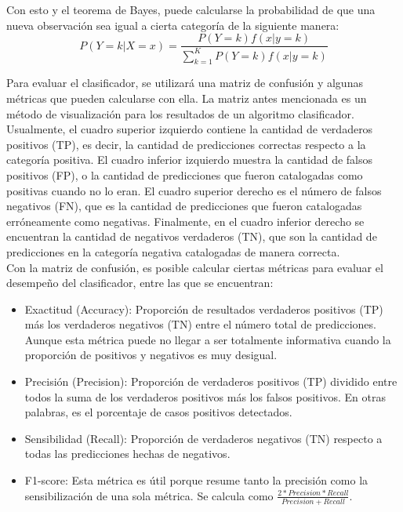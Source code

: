 \documentclass[12pt, letterpaper]{report}
\begin{document}
Con esto y el teorema de Bayes, puede calcularse la probabilidad de que una nueva observación sea igual a cierta categoría de la siguiente manera:
\begin{equation*}
    P(Y=k|X=x)=\frac{P(Y=k)f(x|y=k)}
    {\sum_{k=1}^K P(Y=k)f(x|y=k)}
\end{equation*}

Para evaluar el clasificador, se utilizará una matriz de confusión y algunas métricas que pueden calcularse con ella. La matriz antes mencionada es un método de visualización para los resultados de un algoritmo clasificador. Usualmente, el cuadro superior izquierdo contiene la cantidad de verdaderos positivos (TP), es decir, la cantidad de predicciones correctas respecto a la categoría positiva. El cuadro inferior izquierdo muestra la cantidad de falsos positivos (FP), o la cantidad de predicciones que fueron catalogadas como positivas cuando no lo eran. El cuadro superior derecho es el número de falsos negativos (FN), que es la cantidad de predicciones que fueron catalogadas erróneamente como negativas. Finalmente, en el cuadro inferior derecho se encuentran la cantidad de negativos verdaderos (TN), que son la cantidad de predicciones en la categoría negativa catalogadas de manera correcta. \\

Con la matriz de confusión, es posible calcular ciertas métricas para evaluar el desempeño del clasificador, entre las que se encuentran:
\begin{itemize}
    \item Exactitud (Accuracy): Proporción de resultados verdaderos positivos (TP) más los verdaderos negativos (TN) entre el número total de predicciones. Aunque esta métrica puede no llegar a ser totalmente informativa cuando la proporción de positivos y negativos es muy desigual.
    \item Precisión (Precision): Proporción de verdaderos positivos (TP) dividido entre todos la suma de los verdaderos positivos más los falsos positivos. En otras palabras, es el porcentaje de casos positivos detectados.
    \item Sensibilidad (Recall): Proporción de verdaderos negativos (TN) respecto a todas las predicciones hechas de negativos.
    \item F1-score: Esta métrica es útil porque resume tanto la precisión como la sensibilización de una sola métrica. Se calcula como $\frac{2*Precision*Recall}{Precision+Recall}$.
\end{itemize}
\end{document}
